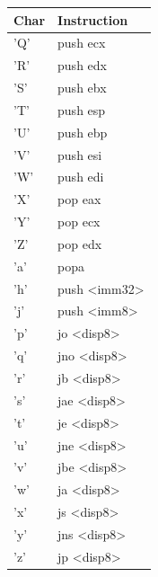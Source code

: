 \documentclass[14pt]{article}
\begin{document}
\begin{tabular}{l|l}
    Char & Instruction\\
    \hline
    'Q' & push ecx\\
    'R' & push edx\\
    'S' & push ebx\\
    'T' & push esp\\
    'U' & push ebp\\
    'V' & push esi\\
    'W' & push edi\\
    'X' & pop eax\\
    'Y' & pop ecx\\
    'Z' & pop edx\\
    'a' & popa\\
    'h' & push <imm32>\\
    'j' & push <imm8>\\
    'p' & jo <disp8> \\
    'q' & jno <disp8>\\
    'r' & jb <disp8> \\
    's' & jae <disp8>\\
    't' & je <disp8> \\
    'u' & jne <disp8>\\
    'v' & jbe <disp8>\\
    'w' & ja <disp8> \\
    'x' & js <disp8> \\
    'y' & jns <disp8>\\
    'z' & jp <disp8> 
\end{tabular}
\end{document}
